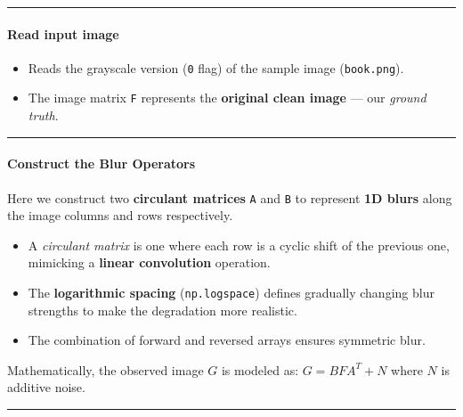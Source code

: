 \documentclass[11pt]{article}
\providecommand{\tightlist}{%
      \setlength{\itemsep}{0pt}\setlength{\parskip}{0pt}}
\begin{document}
\begin{center}\rule{0.5\linewidth}{0.5pt}\end{center}

\hypertarget{read-input-image}{%
\paragraph{\texorpdfstring{\textbf{Read input
image}}{Read input image}}\label{read-input-image}}

\begin{itemize}
\tightlist
\item
  Reads the grayscale version (\texttt{0} flag) of the sample image
  (\texttt{book.png}).
\item
  The image matrix \texttt{F} represents the \textbf{original clean
  image} --- our \emph{ground truth}.
\end{itemize}

\begin{center}\rule{0.5\linewidth}{0.5pt}\end{center}

\hypertarget{construct-the-blur-operators}{%
\paragraph{\texorpdfstring{\textbf{Construct the Blur
Operators}}{Construct the Blur Operators}}\label{construct-the-blur-operators}}

Here we construct two \textbf{circulant matrices} \texttt{A} and
\texttt{B} to represent \textbf{1D blurs} along the image columns and
rows respectively.

\begin{itemize}
\tightlist
\item
  A \emph{circulant matrix} is one where each row is a cyclic shift of
  the previous one, mimicking a \textbf{linear convolution} operation.
\item
  The \textbf{logarithmic spacing} (\texttt{np.logspace}) defines
  gradually changing blur strengths to make the degradation more
  realistic.
\item
  The combination of forward and reversed arrays ensures symmetric blur.
\end{itemize}

Mathematically, the observed image \(G\) is modeled as:
\(G = BFA^T + N\) where \(N\) is additive noise.

\begin{center}\rule{0.5\linewidth}{0.5pt}\end{center}
\end{document}

